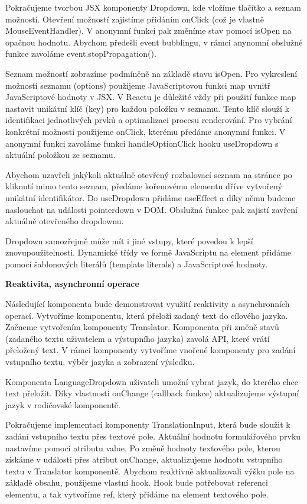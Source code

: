 Pokračujeme tvorbou JSX komponenty Dropdown, kde vložíme tlačítko a seznam možností. Otevření možností zajistíme přidáním onClick (což je vlastně MouseEventHandler). 
V anonymní funkci pak změníme stav pomocí isOpen na opačnou hodnotu. Abychom předešli event bubblingu, v rámci anynomní obslužné funkce zavoláme event.stopPropagation().

Seznam možností zobrazíme podmíněně na základě stavu isOpen. Pro vykreslení možností seznamu (options) použijeme JavaScriptovou funkci map uvnitř JavaScriptové hodnoty v JSX. 
V Reactu je důležité vždy při použití funkce map nastavit unikátní klíč (key) pro každou položku v seznamu. Tento klíč slouží k identifikaci jednotlivých prvků a optimalizaci procesu renderování. 
Pro vybrání konkrétní možnosti použijeme onClick, kterému předáme anonymní funkci. V anonymní funkci zavoláme funkci handleOptionClick hooku useDropdown s aktuální položkou ze seznamu.

Abychom uzavřeli jakýkoli aktuálně otevřený rozbalovací seznam na stránce po kliknutí mimo tento seznam, předáme kořenovému elementu dříve vytvořený unikátní identifikátor. 
Do useDropdown přidáme useEffect a díky němu budeme naslouchat na události pointerdown v DOM. Obslužná funkce pak zajistí zavření aktuálně otevřeného dropdownu.

Dropdown samozřejmě může mít i jiné vstupy, které povedou k lepší znovupoužitelnosti. 
Dynamické třídy ve formě JavaScriptu na element přidáme pomocí šablonových literálů (template literals) a JavaScriptové hodnoty.

\begin{flushleft}
  \textbf{Reaktivita, asynchronní operace}
\end{flushleft}

Následující komponenta bude demonstrovat využití reaktivity a asynchronních operací. Vytvoříme komponentu, která přeloží zadaný text do cílového jazyka. 
Začneme vytvořením komponenty Translator. Komponenta při změně stavů (zadaného textu uživatelem a výstupního jazyka) zavolá API, které vrátí přeložený text.
V rámci komponenty vytvoříme vnořené komponenty pro zadání vstupního textu, výběr jazyka a zobrazení výsledku.

Komponenta LanguageDropdown uživateli umožní vybrat jazyk, do kterého chce text přeložit. 
Díky vlastnosti onChange (callback funkce) aktualizujeme výstupní jazyk v rodičovské komponentě. 

Pokračujeme implementací komponenty TranslationInput, která bude sloužit k zadání vstupního textu přes textové pole. Aktuální hodnotu formulářového prvku nastavíme pomocí atributu value.
Po změně hodnoty textového pole, kterou získáme v události přes atribut onChange, aktualizujeme hodnotu vstupního textu v Translator komponentě. 
Abychom reaktivně aktualizovali výšku pole na základě obsahu, použijeme vlastní hook. 
Hook bude potřebovat referenci elementu, a tak vytvoříme ref, který přidáme na element textového pole.


